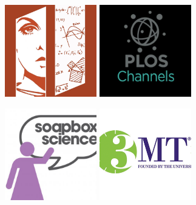 \documentclass{beamer}
\begin{document}
\begin{frame}
    \begin{center}
    \includegraphics[width=0.3\textwidth]{static/wim.jpg}\hspace{10pt}
    \includegraphics[width=0.3\textwidth]{static/plos.jpg}
    \vspace{10pt}

    \includegraphics[width=0.3\textwidth]{static/soapbox.jpg} \hspace{10pt}
    \includegraphics[width=0.3\textwidth]{static/emt.png}\vspace{10pt}
    \end{center}
\end{frame}
\end{document}
